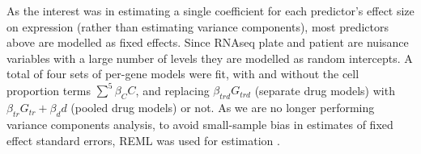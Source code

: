 As the interest was in estimating a single coefficient for each predictor's effect size on expression (rather than estimating variance components), 
most predictors above are modelled as fixed effects.
Since \gls{RNAseq} plate and patient are nuisance variables with a large number of levels they are modelled as random intercepts.
A total of four sets of per-gene models were fit,
with and without the cell proportion terms $\sum_{}^{5}{\beta_C C}$,
and replacing $\beta_{trd} G_{trd}$ (separate drug models) with $\beta_{tr} G_{tr} + \beta_d d$ (pooled drug models) or not.
%
As we are no longer performing variance components analysis,
to avoid small-sample bias in estimates of fixed effect standard errors, \gls{REML} was used for estimation \autocite{mcneish2017SmallSampleMethods}.

